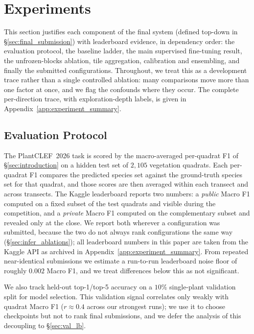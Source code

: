 \section{Experiments}
\label{sec:experiments}

This section justifies each component of the final system (defined top-down in
\S\ref{sec:final_submission}) with leaderboard evidence, in dependency order: the evaluation
protocol, the baseline ladder, the main supervised fine-tuning result, the unfrozen-blocks
ablation, tile aggregation, calibration and ensembling, and finally the submitted
configurations. Throughout, we treat this as a development trace rather than a single
controlled ablation: many comparisons move more than one factor at once, and we flag the
confounds where they occur. The complete per-direction trace, with exploration-depth labels,
is given in Appendix~\ref{app:experiment_summary}.

\subsection{Evaluation Protocol}
\label{sec:eval_protocol}

The PlantCLEF~2026 task is scored by the macro-averaged per-quadrat F1 of
\S\ref{sec:introduction} on a hidden test set of $2{,}105$ vegetation quadrats. Each per-quadrat
F1 compares the predicted species set against the ground-truth species set for that quadrat, and
those scores are then averaged within each transect and across transects. The Kaggle leaderboard reports two numbers: a \emph{public}
Macro F1 computed on a fixed subset of the test quadrats and visible during the competition,
and a \emph{private} Macro F1 computed on the complementary subset and revealed only at the
close. We report both wherever a configuration was submitted, because the two do not always
rank configurations the same way (\S\ref{sec:infer_ablations}); all leaderboard numbers in
this paper are taken from the Kaggle API as archived in Appendix~\ref{app:experiment_summary}.
From repeated near-identical submissions we estimate a run-to-run leaderboard noise floor of
roughly $0.002$ Macro F1, and we treat differences below this as not significant.

We also track held-out top-1/top-5 accuracy on a $10\%$ single-plant validation split for
model selection. This validation signal correlates only weakly with quadrat Macro F1
($r\approx0.4$ across our strongest runs); we use it to choose checkpoints but not to rank
final submissions, and we defer the analysis of this decoupling to \S\ref{sec:val_lb}.

